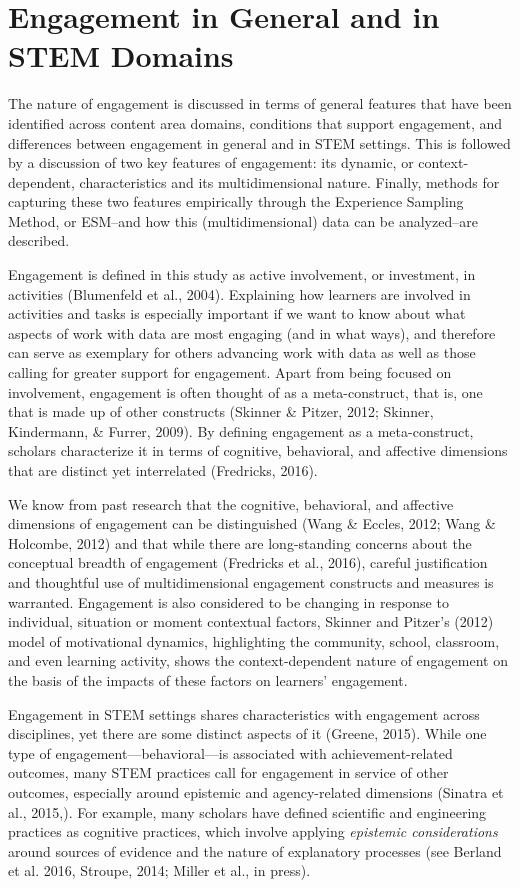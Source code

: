 \documentclass[]{msu-thesis}
\theoremstyle{definition}
\theoremstyle{definition}
\theoremstyle{definition}
\theoremstyle{remark}
\begin{document}
\section{Engagement in General and in STEM
Domains}\label{engagement-in-general-and-in-stem-domains}

The nature of engagement is discussed in terms of general features that
have been identified across content area domains, conditions that
support engagement, and differences between engagement in general and in
STEM settings. This is followed by a discussion of two key features of
engagement: its dynamic, or context-dependent, characteristics and its
multidimensional nature. Finally, methods for capturing these two
features empirically through the Experience Sampling Method, or ESM--and
how this (multidimensional) data can be analyzed--are described.

Engagement is defined in this study as active involvement, or
investment, in activities (Blumenfeld et al., 2004). Explaining how
learners are involved in activities and tasks is especially important if
we want to know about what aspects of work with data are most engaging
(and in what ways), and therefore can serve as exemplary for others
advancing work with data as well as those calling for greater support
for engagement. Apart from being focused on involvement, engagement is
often thought of as a meta-construct, that is, one that is made up of
other constructs (Skinner \& Pitzer, 2012; Skinner, Kindermann, \&
Furrer, 2009). By defining engagement as a meta-construct, scholars
characterize it in terms of cognitive, behavioral, and affective
dimensions that are distinct yet interrelated (Fredricks, 2016).

We know from past research that the cognitive, behavioral, and affective
dimensions of engagement can be distinguished (Wang \& Eccles, 2012;
Wang \& Holcombe, 2012) and that while there are long-standing concerns
about the conceptual breadth of engagement (Fredricks et al., 2016),
careful justification and thoughtful use of multidimensional engagement
constructs and measures is warranted. Engagement is also considered to
be changing in response to individual, situation or moment contextual
factors, Skinner and Pitzer's (2012) model of motivational dynamics,
highlighting the community, school, classroom, and even learning
activity, shows the context-dependent nature of engagement on the basis
of the impacts of these factors on learners' engagement.

Engagement in STEM settings shares characteristics with engagement
across disciplines, yet there are some distinct aspects of it (Greene,
2015). While one type of engagement---behavioral---is associated with
achievement-related outcomes, many STEM practices call for engagement in
service of other outcomes, especially around epistemic and
agency-related dimensions (Sinatra et al., 2015,). For example, many
scholars have defined scientific and engineering practices as cognitive
practices, which involve applying \emph{epistemic considerations} around
sources of evidence and the nature of explanatory processes (see Berland
et al. 2016, Stroupe, 2014; Miller et al., in press).
\end{document}
